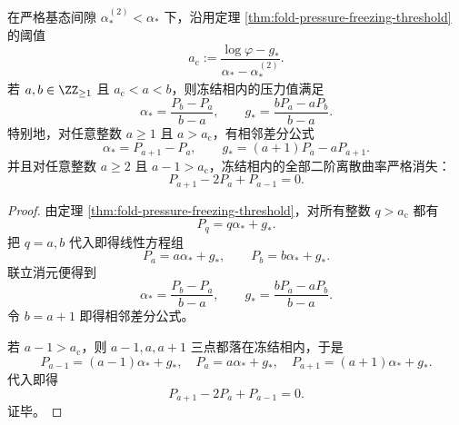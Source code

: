 \begin{theorem}\label{thm:xi-freezing-affine-rigidity-two-point-recovery}
在严格基态间隙 \(\alpha_*^{(2)}<\alpha_*\) 下，沿用定理 \ref{thm:fold-pressure-freezing-threshold} 的阈值
\[
a_{\mathrm c}:=\frac{\log\varphi-g_*}{\alpha_*-\alpha_*^{(2)}}.
\]
若 \(a,b\in \ZZ_{\ge 1}\) 且 \(a_{\mathrm c}<a<b\)，则冻结相内的压力值满足
\[
\boxed{\;
\alpha_*=\frac{P_b-P_a}{\,b-a\,},
\qquad
g_*=\frac{bP_a-aP_b}{\,b-a\,}.\;}
\]
特别地，对任意整数 \(a\ge 1\) 且 \(a>a_{\mathrm c}\)，有相邻差分公式
\[
\boxed{\;
\alpha_*=P_{a+1}-P_a,
\qquad
g_*=(a+1)P_a-aP_{a+1}.\;}
\]
并且对任意整数 \(a\ge 2\) 且 \(a-1>a_{\mathrm c}\)，冻结相内的全部二阶离散曲率严格消失：
\[
\boxed{\;
P_{a+1}-2P_a+P_{a-1}=0.\;}
\]
\end{theorem}
\begin{proof}
由定理 \ref{thm:fold-pressure-freezing-threshold}，对所有整数 \(q>a_{\mathrm c}\) 都有
\[
P_q=q\alpha_*+g_*.
\]
把 \(q=a,b\) 代入即得线性方程组
\[
P_a=a\alpha_*+g_*,
\qquad
P_b=b\alpha_*+g_*.
\]
联立消元便得到
\[
\alpha_*=\frac{P_b-P_a}{b-a},
\qquad
g_*=\frac{bP_a-aP_b}{b-a}.
\]
令 \(b=a+1\) 即得相邻差分公式。
\par
若 \(a-1>a_{\mathrm c}\)，则 \(a-1,a,a+1\) 三点都落在冻结相内，于是
\[
P_{a-1}=(a-1)\alpha_*+g_*,
\quad
P_a=a\alpha_*+g_*,
\quad
P_{a+1}=(a+1)\alpha_*+g_*.
\]
代入即得
\[
P_{a+1}-2P_a+P_{a-1}=0.
\]
证毕。
\end{proof}

